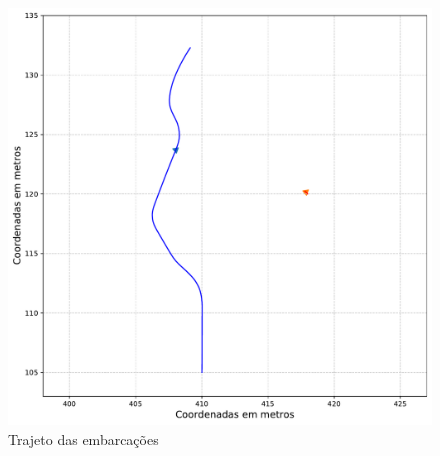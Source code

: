             \begin{figure}[H]
                \centering
                \includegraphics[scale=0.45]{fig/chap5/crossing_right_stopped_vessel_cpa_trajectory.pdf}
                \caption{Trajeto das embarcações}
                \label{fig:chap5_crossing_right_stopped_vessel_cpa_paths}
            \end{figure}
            
